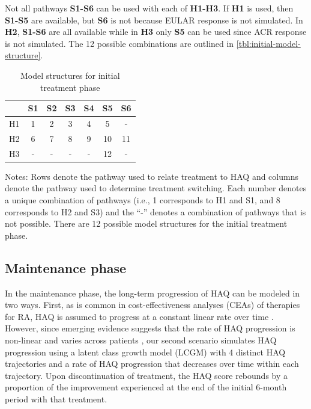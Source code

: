 \documentclass[11pt,final,fleqn]{article}
\theoremstyle{plain}
\begin{document}
Not all pathways \textbf{S1-S6} can be used with each of \textbf{H1-H3}. If \textbf{H1} is used, then \textbf{S1-S5} are available, but \textbf{S6} is not because EULAR response is not simulated. In \textbf{H2}, \textbf{S1-S6} are all available while in \textbf{H3} only \textbf{S5} can be used since ACR response is not simulated. The 12 possible combinations are outlined in \autoref{tbl:initial-model-structure}.  

\begin{table}[!ht] 
\begin{center}
\begin{threeparttable}
\caption{Model structures for initial treatment phase} \label{tbl:initial-model-structure}
\begin{tabularx}{\textwidth}{@{\extracolsep{\fill}}lcccccc}
\hline
\multicolumn{1}{l}{} & \multicolumn{1}{c}{S1} & \multicolumn{1}{c}{S2} & \multicolumn{1}{c}{S3} & \multicolumn{1}{c}{S4} & \multicolumn{1}{c}{S5} & \multicolumn{1}{c}{S6}  \\
\hline
H1 & 1 & 2 & 3 & 4 & 5 & - \\
H2 & 6 & 7 & 8 & 9 & 10 & 11 \\
H3 & - & - & - & - & 12  & -\\
\hline
\end{tabularx}
\scriptsize
Notes: Rows denote the pathway used to relate treatment to HAQ and columns denote the pathway used to determine treatment switching. Each number denotes a unique combination of pathways (i.e., 1 corresponds to H1 and S1, and 8 corresponds to H2 and S3) and the ``-'' denotes a combination of pathways that is not possible. There are 12 possible model structures for the initial treatment phase. 
\end{threeparttable}
\end{center}
\end{table}

\subsection{Maintenance phase}
In the maintenance phase, the long-term progression of HAQ can be modeled in two ways. First, as is common in cost-effectiveness analyses (CEAs) of therapies for RA, HAQ is assumed to progress at a constant linear rate over time \citep[see][]{tosh2011sheffield, wailoo2008biologic}. However, since emerging evidence suggests that the rate of HAQ progression is non-linear and varies across patients \citep{gibson2016haq}, our second scenario simulates HAQ progression using a latent class growth model (LCGM) \citep{norton2014health} with 4 distinct HAQ trajectories and a rate of HAQ progression that decreases over time within each trajectory. Upon discontinuation of treatment, the HAQ score rebounds by a proportion of the improvement experienced at the end of the initial 6-month period with that treatment.
\end{document}
